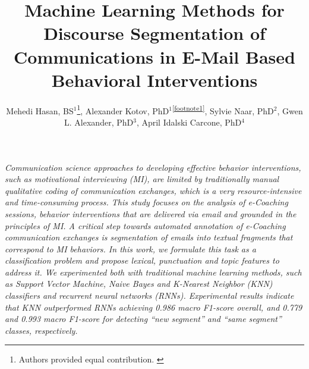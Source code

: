 \documentclass{amia}
\begin{document}
\title{Machine Learning Methods for Discourse Segmentation of Communications in E-Mail Based Behavioral Interventions}

\author{Mehedi Hasan, BS$^{1}$\footnote[1]{Authors provided equal contribution. \label{footnote1}}, Alexander Kotov, PhD$^{1}$\textsuperscript{\ref{footnote1}}, Sylvie Naar, PhD$^{2}$, Gwen L. Alexander, PhD$^{3}$, April Idalski Carcone, PhD$^{4}$}


\maketitle

\textit{Communication science approaches to developing effective behavior interventions, such as motivational interviewing (MI), are limited by traditionally manual qualitative coding of communication exchanges, which is a very resource-intensive and time-consuming process. This study focuses on the analysis of e-Coaching sessions, behavior interventions that are delivered via email and grounded in the principles of MI. A critical step towards automated annotation of e-Coaching communication exchanges is segmentation of emails into textual fragments that correspond to MI behaviors. In this work, we formulate this task as a classification problem and propose lexical, punctuation and topic features to address it. We experimented both with traditional machine learning methods, such as Support Vector Machine, Naive Bayes and K-Nearest Neighbor (KNN) classifiers and recurrent neural networks (RNNs). Experimental results indicate that KNN outperformed RNNs achieving 0.986 macro F1-score overall, and 0.779 and 0.993 macro F1-score for detecting ``new segment'' and ``same segment'' classes, respectively.}
\end{document}
